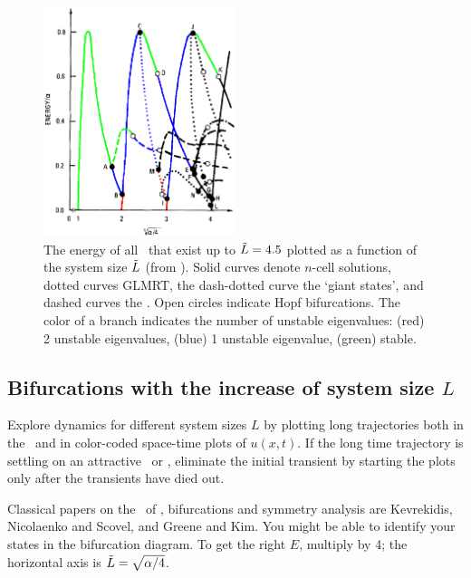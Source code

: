 \documentclass[letterpaper,10pt,fleqn,notitlepage]{article}
\begin{document}
\begin{figure}[t]       \label{fig:GreeneKim}
\begin{center}
\includegraphics[width=0.5\textwidth]{GreeneKimBifColor.eps}
\end{center}
\caption{
The energy   of all  \eqva\ that exist up 
to $\tilde{L} = 4.5$
plotted as a function of the system size
$\tilde{L}$ (from ).
Solid curves denote $n$-cell solutions,
dotted curves GLMRT, the dash-dotted curve the
`giant states', and dashed curves the \reqva.
Open circles indicate Hopf bifurcations.
The color of a branch indicates the number of unstable
eigenvalues: (red) 2 unstable eigenvalues, (blue) 1
unstable eigenvalue, (green) stable.
        }
\end{figure}

\subsection{Bifurcations with the  increase of system size $L$}

Explore dynamics for different system sizes $L$
by plotting long trajectories both in the \statesp\ and
in color-coded space-time plots of $u(x,t)$. If the long
time trajectory is settling on an
attractive \eqv\ or \po, eliminate the initial
transient by starting the plots only after the
transients have died out.

Classical papers on the \eqva\ of
\KSe, bifurcations and symmetry analysis are
Kevrekidis, Nicolaenko and Scovel,
and Greene and Kim. You might be able to 
identify your states in the 
 bifurcation diagram.
To get the right $E$, multiply
by 4; the horizontal axis is $\tilde{L} = \sqrt{\alpha/4}$.
  
\end{document}

